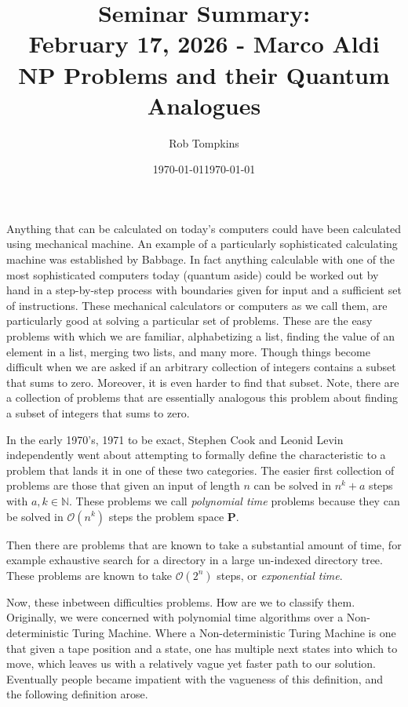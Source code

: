 \documentclass[12pt]{amsart}
\title{Seminar Summary:\\February 17, 2026 - Marco Aldi\\NP Problems and their Quantum Analogues}
\author{Rob Tompkins}
\date{\today}
\theoremstyle{definition}
\theoremstyle{question}
\begin{document}
    \maketitle
    \date{\today}
    \begin{onehalfspace}
        Anything that can be calculated on today's computers could have been calculated using mechanical machine.
        An example of a particularly sophisticated calculating machine was established by Babbage.
        In fact anything calculable with one of the most sophisticated computers today (quantum aside) could be
        worked out by hand in a step-by-step process with boundaries given for input and a sufficient set of
        instructions.
        These mechanical calculators or computers as we call them, are particularly good at solving a particular
        set of problems.
        These are the easy problems with which we are familiar, alphabetizing a list,
        finding the value of an element in a list, merging two lists, and many more.
        Though things become difficult when we are asked if an arbitrary collection of integers contains a subset that
        sums to zero.
        Moreover, it is even harder to find that subset.
        Note, there are a collection of problems that are essentially analogous this problem about finding a subset of
        integers that sums to zero.

        In the early 1970's, 1971 to be exact, Stephen Cook and Leonid Levin independently went about attempting to
        formally define the characteristic to a problem that lands it in one of these two categories.
        The easier first collection of problems are those that given an input of length $n$ can be solved in
        $n^k + a$ steps with $a,k\in\mathbb{N}$.
        These problems we call \emph{polynomial time} problems because they can be solved in $\mathcal{O}(n^k)$ steps
        the problem space $\mathbf{P}$.

        Then there are problems that are known to take a substantial amount of time, for example exhaustive
        search for a directory in a large un-indexed directory tree.
        These problems are known to take $\mathcal{O}(2^n)$ steps, or \emph{exponential time}.

        Now, these inbetween difficulties problems.
        How are we to classify them.
        Originally, we were concerned with polynomial time algorithms over a Non-deterministic Turing Machine.
        Where a Non-deterministic Turing Machine is one that given a tape position and a state, one has multiple next states
        into which to move, which leaves us with a relatively vague yet faster path to our solution.
        Eventually people became impatient with the vagueness of this definition, and the following definition arose.


\end{onehalfspace}
\end{document}
